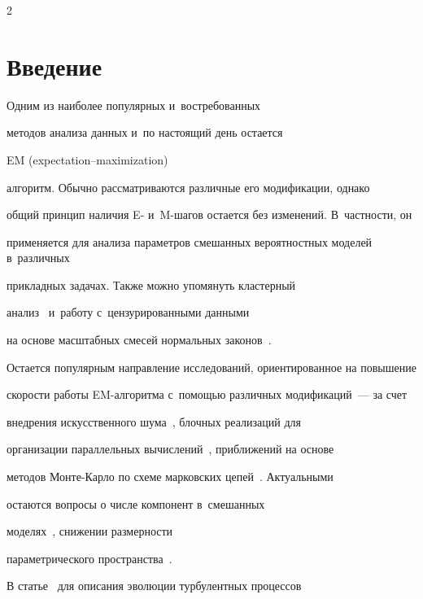 \begin{multicols}{2}



\label{st\stat}





\section{Введение}






Одним из наиболее популярных и~востребованных 

методов анализа данных и~по настоящий день остается

EM (expectation--maximization) 

алгоритм. Обычно рассматриваются различные его модификации, однако 

общий принцип наличия E- и~\mbox{M-ша}\-гов остается без изменений. В~частности, он 

при\-меняется для анализа па\-ра\-мет\-ров смешанных вероятностных моделей в~различных 

прикладных задачах. Также можно упомянуть кластерный 

анализ~\cite{Yang2012, Cai2019,Hassen2019} и~работу с~цензурированными данными 

на основе масштабных смесей нормальных законов~\cite{Zeller2019}. 

Остается популярным на\-прав\-ле\-ние исследований, ориентированное на повышение 

скорости работы EM-ал\-го\-рит\-ма с~помощью различных модификаций~--- за счет

 внедрения искусственного шума~\cite{Osoba2013}, блочных реализаций для 

 организации параллельных вычислений~\cite{Lee2018}, приближений на основе 

 методов Мон\-те-Кар\-ло по схеме марковских цепей~\cite{Wu2019}. Актуальными 

 остаются вопросы о числе компонент в~смешанных 

 моделях~\cite{Verbeek2003,Gorshenin2011,Liu2019}, снижении размерности 

 параметрического пространства~\cite{Yu2019}.



В статье~\cite{Gorshenin2019a} для описания эволюции турбулентных процессов 


\end{multicols}
